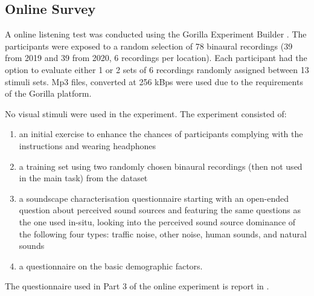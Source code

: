  \subsection{Online Survey}

   A online listening test was conducted using the Gorilla Experiment Builder \href{www.275gorilla.sc}{} \citep{AnwylIrvine2020Gorilla}. The participants were exposed to a random selection of 78 binaural recordings (39 from 2019 and 39 from 2020, 6 recordings per location). Each participant had the option to evaluate either 1 or 2 sets of 6 recordings randomly assigned between 13 stimuli sets. Mp3 files, converted at 256 kBps were used due to the requirements of the Gorilla platform.

   No visual stimuli were used in the experiment. The experiment consisted of:

   \begin{enumerate}
     \item an initial exercise to enhance the chances of participants complying with the instructions and wearing headphones
     \item a training set using two randomly chosen binaural recordings (then not used in the main task) from the dataset
     \item a soundscape characterisation questionnaire starting with an open-ended question about perceived sound sources and featuring the same questions as the one used in-situ, looking into the perceived sound source dominance of the following four types: traffic noise, other noise, human sounds, and natural sounds
     \item a questionnaire on the basic demographic factors.
   \end{enumerate}

   The questionnaire used in Part 3 of the online experiment is report in .

